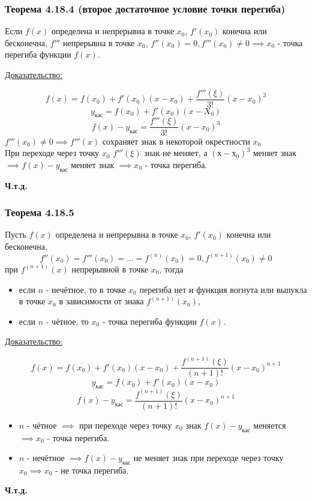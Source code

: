 \documentclass[12pt]{article}
\begin{document}
    \subsubsection*{Теорема 4.18.4 (второе достаточное условие точки перегиба)}\label{th:4.18.4}
    Если $f(x)$ определена и непрерывна в точке $x_0$, $f'(x_0)$ конечна или бесконечна, $f'''$ непрерывна в точке $x_0$, $f''(x_0) = 0, f'''(x_0) \ne 0 \implies x_0$ - точка перегиба функции $f(x)$.\par\noindent
    \underline{Доказательство:}
    \begin{adjustwidth}{1.5em}{1.5em}
        \[ f(x) = f(x_0) + f'(x_0)(x-x_0) + \frac{f'''(\xi)}{3!}(x-x_0)^3 \]
        \[ y_{\text{кас}} = f(x_0) + f'(x_0)(x-X_0) \]
        \[ f(x) - y_{\text{кас}} = \boxed{ \frac{f'''(\xi)}{3!}(x-x_0)^3 } \]
        $f'''(x_0) \ne 0 \implies f'''(x)$ сохраняет знак в некоторой окрестности $x_0$\\
        При переходе через точку $x_0$ $f'''(\xi)$ знак не меняет, а $(х - х_0)^3$ меняет знак $\implies f(x) - y_{\text{кас}}$ меняет знак $\implies x_0$ - точка перегиба.
        \begin{center}
            \textbf{Ч.т.д.}
        \end{center}
    \end{adjustwidth}

    \subsubsection*{Теорема 4.18.5}\label{th:4.18.5}
    Пусть $f(x)$ определена и непрерывна в точке $x_0$, $f'(x_0)$ конечна или бесконечна,
    \[ f''(x_0) = f'''(x_0) = \dots = f^{(n)}(x_0) = 0, f^{(n+1)}(x_0) \ne 0 \]
    при $f^{(n+1)}(x)$ непрерывной в точке $x_0$, тогда \begin{itemize}
        \item если $n$ - нечётное, то в точке $x_0$ перегиба нет и функция вогнута или выпукла в точке $x_0$ в зависимости от знака $f^{(n+1)}(x_0)$,
        \item если $n$ - чётное, то $x_0$ - точка перегиба функции $f(x)$.
    \end{itemize}
    \underline{Доказательство:}
    \begin{adjustwidth}{1.5em}{1.5em}
        \[ f(x) = f(x_0) + f'(x_0)(x-x_0) + \frac{f^{(n+1)}(\xi)}{(n+1)!}(x-x_0)^{n+1} \]
        \[ y_{\text{кас}} = f(x_0) + f'(x_0)(x-x_0) \]
        \[ f(x) - y_{\text{кас}} = \frac{f^{(n+1)}(\xi)}{(n+1)!}(x-x_0)^{n+1} \]
        \begin{itemize}
            \item $n$ - чётное $\implies$ при переходе через точку $x_0$ знак $f(x) - y_{\text{кас}}$ меняется $\implies x_0$ - точка перегиба.
            \item $n$ - нечётное $\implies f(x) - y_{\text{кас}}$ не меняет знак при переходе через точку $x_0 \implies x_0$ - не точка перегиба.
        \end{itemize}
        \begin{center}
            \textbf{Ч.т.д.}
        \end{center}
    \end{adjustwidth}
    
\end{document}
